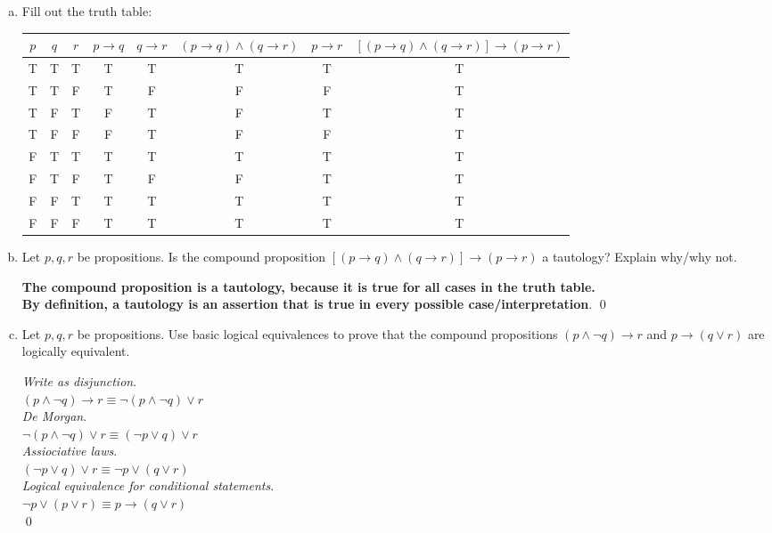 \documentclass[12pt]{article}
\begin{document}
\begin{enumerate}[a)]
\item Fill out the truth table:\\
 \begin{tabular}[t]{|c|c|c|c|c|c|c|c|}
   \toprule
   $p$ & $q$ & $r$ & $p\to q$ & $q\to r$ & $(p\to q)\land (q\to r)$ 
   & $p\to r$   & $[(p\to q)\land (q\to r)]\to (p\to r)$\\
   \midrule 
   T & T & T & T & T & T & T & T \\
   \hline
   T & T & F & T & F & F & F & T \\
   \hline
   T & F & T & F & T & F & T & T\\
   \hline 
   T & F & F & F & T & F & F & T\\
   \hline 
   F & T & T & T & T & T & T & T\\
   \hline 
   F & T & F & T & F & F & T & T\\
   \hline 
   F & F & T & T & T & T & T & T\\
   \hline 
   F & F & F & T & T & T & T & T\\
   \bottomrule
 \end{tabular}
\item Let $p,q,r$ be propositions. Is the compound proposition
  $[(p\to q)\land (q\to r)]\to (p\to r)$ a tautology?
  Explain why/why not.

  \textbf{The compound proposition is a tautology, because it is true for all cases in the truth table.\\
    By definition, a tautology is an assertion that is true in every possible case/interpretation}.
  \qed
\medskip

\item Let $p,q,r$ be propositions. Use basic logical equivalences to
  prove that the compound propositions $(p\land \lnot q)\to  r$
  and $p\to (q\lor r)$ are logically equivalent.

\textit{Write as disjunction}. \\
$(p \wedge \neg q) \rightarrow r \equiv \neg (p \wedge \neg q) \vee r$\\
\textit{De Morgan}. \\
$ \neg (p \wedge \neg q) \vee r \equiv (\neg p \vee q) \vee r$\\
\textit{Assiociative laws}. \\
$ (\neg p \vee q) \vee r \equiv \neg p \vee ( q \vee r)$\\
\textit{Logical equivalence for conditional statements}. \\
$ \neg p \vee (p \vee r) \equiv p \rightarrow (q \vee r) $\\
\qed



\end{enumerate}
\end{document}
